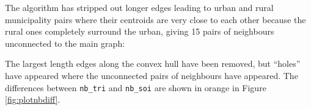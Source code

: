 \documentclass[]{book}
\newenvironment{Shaded}{\begin{snugshade}}{\end{snugshade}}
\newcommand{\CommentTok}[1]{\textcolor[rgb]{0.56,0.35,0.01}{\textit{#1}}}
\newcommand{\DataTypeTok}[1]{\textcolor[rgb]{0.13,0.29,0.53}{#1}}
\newcommand{\DecValTok}[1]{\textcolor[rgb]{0.00,0.00,0.81}{#1}}
\newcommand{\FloatTok}[1]{\textcolor[rgb]{0.00,0.00,0.81}{#1}}
\newcommand{\KeywordTok}[1]{\textcolor[rgb]{0.13,0.29,0.53}{\textbf{#1}}}
\newcommand{\NormalTok}[1]{#1}
\newcommand{\OperatorTok}[1]{\textcolor[rgb]{0.81,0.36,0.00}{\textbf{#1}}}
\newcommand{\OtherTok}[1]{\textcolor[rgb]{0.56,0.35,0.01}{#1}}
\newcommand{\StringTok}[1]{\textcolor[rgb]{0.31,0.60,0.02}{#1}}
\begin{document}
The algorithm has stripped out longer edges leading to urban and rural municipality pairs where their centroids are very close to each other because the rural ones completely surround the urban, giving 15 pairs of neighbours unconnected to the main graph:

\begin{Shaded}
\end{Shaded}

The largest length edges along the convex hull have been removed, but ``holes'' have appeared where the unconnected pairs of neighbours have appeared. The differences between \texttt{nb\_tri} and \texttt{nb\_soi} are shown in orange in Figure \ref{fig:plotnbdiff}.



\begin{Shaded}
\end{Shaded}
\end{document}
